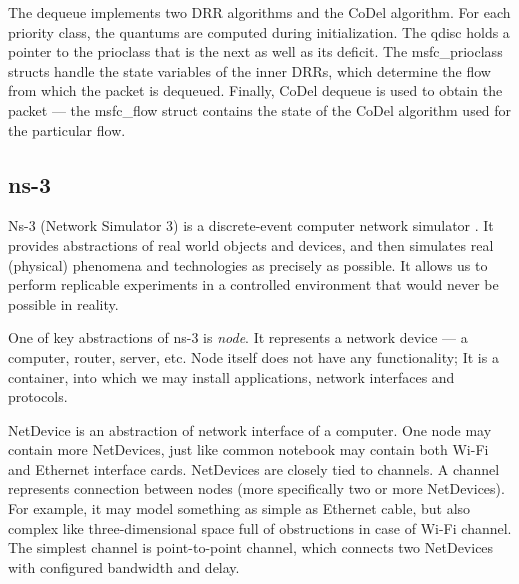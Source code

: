 The dequeue implements two DRR algorithms and the CoDel algorithm. For each priority class, the quantums are computed during initialization. The qdisc holds a pointer to the prioclass that is the next as well as its deficit. The msfc\_prioclass structs handle the state variables of the inner DRRs, which determine the flow from which the packet is dequeued. Finally, CoDel dequeue is used to obtain the packet --- the msfc\_flow struct contains the state of the CoDel algorithm used for the particular flow.

\subsection {ns-3}

Ns-3 (Network Simulator 3) is a discrete-event computer network simulator \cite{ns3}. It provides abstractions of real world objects and devices, and then simulates real (physical) phenomena and technologies as precisely as possible.  It allows us to perform replicable  experiments in a controlled environment that would never be possible in reality.

One of key abstractions of ns-3 is \emph{node}. It represents a network device --- a computer, router, server, etc. Node itself does not have any functionality; It is a container, into which we may install applications, network interfaces and protocols.

NetDevice is an abstraction of network interface of a computer. One node may contain more NetDevices, just like common notebook may contain both Wi-Fi and Ethernet interface cards. NetDevices are closely tied to channels. A channel represents connection between nodes (more specifically two or more NetDevices). For example, it may model something as simple as  Ethernet cable, but also complex  like  three-dimensional space full of obstructions in case of  Wi-Fi channel. The simplest channel is point-to-point channel, which connects two NetDevices with configured bandwidth and delay.


